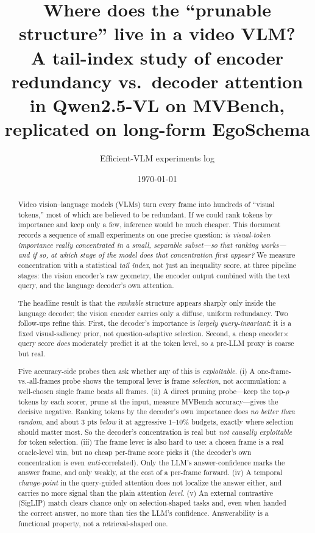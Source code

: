 \documentclass[11pt]{article}
\title{\textbf{Where does the ``prunable structure'' live in a video VLM?}\\[2pt]
\large A tail-index study of encoder redundancy vs.\ decoder attention\\ in Qwen2.5-VL on MVBench, replicated on long-form EgoSchema}
\author{Efficient-VLM experiments log}
\date{\today}
\begin{document}
\maketitle

\begin{abstract}
Video vision--language models (VLMs) turn every frame into hundreds of ``visual
tokens,'' most of which are believed to be redundant. If we could rank tokens by
importance and keep only a few, inference would be much cheaper. This document records a
sequence of small experiments on one precise question: \emph{is visual-token importance
really concentrated in a small, separable subset---so that ranking works---and if so, at
which stage of the model does that concentration first appear?} We measure concentration
with a statistical \emph{tail index}, not just an inequality score, at three pipeline
stages: the vision encoder's raw geometry, the encoder output combined with the text
query, and the language decoder's own attention.

The headline result is that the \emph{rankable} structure appears sharply only inside the
language decoder; the vision encoder carries only a diffuse, uniform redundancy. Two
follow-ups refine this. First, the decoder's importance is \emph{largely
query-invariant}: it is a fixed visual-saliency prior, not question-adaptive selection.
Second, a cheap encoder$\times$query score \emph{does} moderately predict it at the token
level, so a pre-LLM proxy is coarse but real.

Five accuracy-side probes then ask whether any of this is \emph{exploitable}. (i) A
one-frame-vs.-all-frames probe shows the temporal lever is frame \emph{selection}, not
accumulation: a well-chosen single frame beats all frames. (ii) A direct pruning
probe---keep the top-$\rho$ tokens by each scorer, prune at the input, measure MVBench
accuracy---gives the decisive negative. Ranking tokens by the decoder's own importance
does \emph{no better than random}, and about 3 pts \emph{below} it at aggressive
$1$--$10\%$ budgets, exactly where selection should matter most. So the decoder's
concentration is real but \emph{not causally exploitable} for token selection. (iii) The
frame lever is also hard to use: a chosen frame is a real oracle-level win, but no cheap
per-frame score picks it (the decoder's own concentration is even
\emph{anti}-correlated). Only the LLM's answer-confidence marks the answer frame, and only
weakly, at the cost of a per-frame forward. (iv) A temporal \emph{change-point} in the
query-guided attention does not localize the answer either, and carries no more signal
than the plain attention \emph{level}. (v) An external contrastive (SigLIP) match clears
chance only on selection-shaped tasks and, even when handed the correct answer, no more
than ties the LLM's confidence. Answerability is a functional property, not a
retrieval-shaped one.


\end{abstract}
\end{document}
